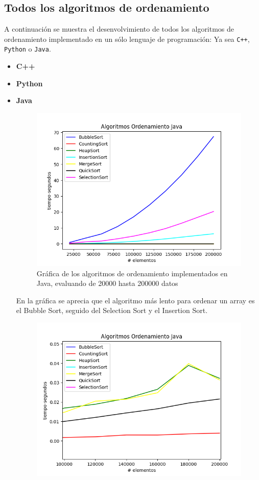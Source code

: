 \subsection*{Todos los algoritmos de ordenamiento}
A continuación se muestra el desenvolvimiento de todos los algoritmos de ordenamiento implementado en un sólo lenguaje de programación: Ya sea \verb!C++!, \verb!Python! o \verb!Java!.
\begin{itemize}
    \item \textbf{C++}
    \item \textbf{Python}
    \item \textbf{Java}
        \begin{figure}[H]
	        \centering
	        \includegraphics[scale=0.5]{../images/plots/Sorts_Java.png}
	        \caption{Gráfica de los algoritmos de ordenamiento implementados en Java, evaluando de 20000 hasta 200000 datos}
		\end{figure}
En la gráfica se aprecia que el algoritmo más lento para ordenar un array es el Bubble Sort, seguido del Selection Sort y el Insertion Sort.
        \begin{figure}[H]
	        \centering
	        \includegraphics[scale=0.5]{Practica01/images/plots/Sorts2_Java.png}

\end{figure}
\end{itemize}
